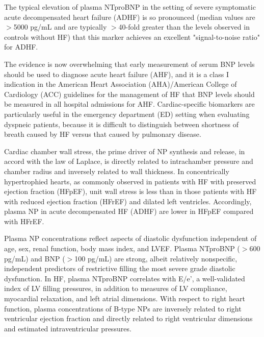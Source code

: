 \documentclass[14pt,a4paper,onecolumn]{extarticle}
\begin{document}
The typical elevation of plasma NTproBNP in the setting of severe symptomatic acute decompensated heart failure (ADHF) is so pronounced (median values are $>$5000 pg/mL and are typically $>$40-fold greater than the levels observed in controls without HF) that this marker achieves an excellent "signal-to-noise ratio" for ADHF. \citep{Richards2018}

The evidence is now overwhelming that early measurement of serum BNP levels should be used to diagnose acute heart failure (AHF), and it is a class I indication in the American Heart Association (AHA)/American College of Cardiology (ACC) guidelines for the management of HF that BNP levels should be measured in all hospital admissions for AHF. Cardiac-specific biomarkers are particularly useful in the emergency department (ED) setting when evaluating dyspneic patients, because it is difficult to distinguish between shortness of breath caused by HF versus that caused by pulmonary disease. \citep{Maisel2018}


Cardiac chamber wall stress, the prime driver of NP synthesis and release, in accord with the law of Laplace, is directly related to intrachamber pressure and chamber radius and inversely related to wall thickness. In concentrically hypertrophied hearts, as commonly observed in patients with HF with preserved ejection fraction (HFpEF), unit wall stress is less than in those patients with HF with reduced ejection fraction (HFrEF) and dilated left ventricles. Accordingly, plasma NP in acute decompensated HF (ADHF) are lower in HFpEF compared with HFrEF. \citep{Richards2018}

Plasma NP concentrations reflect aspects of diastolic dysfunction independent of age, sex, renal function, body mass index, and LVEF. Plasma NTproBNP ($>$600 pg/mL) and BNP ($>$100 pg/mL) are strong, albeit relatively nonspecific, independent predictors of restrictive filling the most severe grade diastolic dysfunction. In HF, plasma NTproBNP correlates with E/e’, a well-validated index of LV filling pressures, in addition to measures of LV compliance, myocardial relaxation, and left atrial dimensions. With respect to right heart function, plasma concentrations of B-type NPs are inversely related to right ventricular ejection fraction and directly related to right ventricular dimensions and estimated intraventricular pressures. \citep{Troughton2009}
\end{document}
